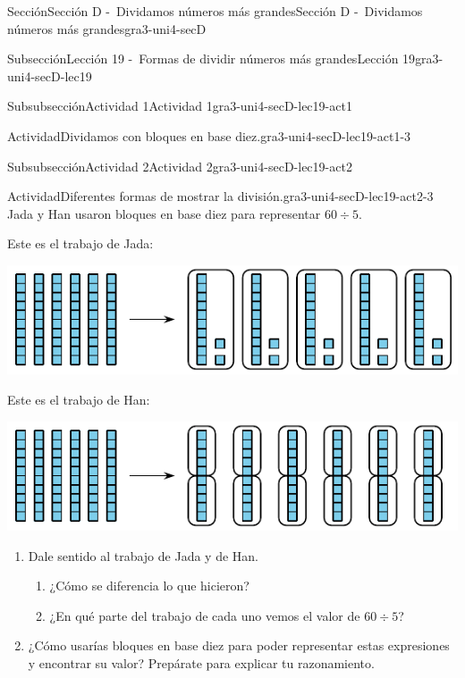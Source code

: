 \documentclass[twoside,10pt,]{article}
\begin{document}
\begin{sectionptx}{Sección}{Sección D -~Dividamos números más grandes}{}{Sección D -~Dividamos números más grandes}{}{}{gra3-uni4-secD}
\begin{subsectionptx}{Subsección}{Lección 19 -~Formas de dividir números más grandes}{}{Lección 19}{}{}{gra3-uni4-secD-lec19}
\begin{subsubsectionptx}{Subsubsección}{Actividad 1}{}{Actividad 1}{}{}{gra3-uni4-secD-lec19-act1}
\begin{activity}{Actividad}{Dividamos con bloques en base diez.}{gra3-uni4-secD-lec19-act1-3}
\begin{sidebyside}{2}{0}{0}{0.1}
\begin{sbspanel}{0.2}
\end{sbspanel}%
\end{sidebyside}%
\end{activity}%
\end{subsubsectionptx}
%
%
\typeout{************************************************}
\typeout{************************************************}
%
\begin{subsubsectionptx}{Subsubsección}{Actividad 2}{}{Actividad 2}{}{}{gra3-uni4-secD-lec19-act2}
\begin{activity}{Actividad}{Diferentes formas de mostrar la división.}{gra3-uni4-secD-lec19-act2-3}%
Jada y Han usaron bloques en base diez para representar \(60 \div 5\).%
\par
Este es el trabajo de Jada:%
\begin{image}{0}{1}{0}{}%
\includegraphics[width=\linewidth]{external/svg-source/tikz-file-152963.pdf}
\end{image}%
Este es el trabajo de Han:%
\begin{image}{0}{1}{0}{}%
\includegraphics[width=\linewidth]{external/svg-source/tikz-file-152964.pdf}
\end{image}%
%
\begin{enumerate}
\item{}Dale sentido al trabajo de Jada y de Han.%
%
\begin{enumerate}
\item{}¿Cómo se diferencia lo que hicieron?%
\item{}¿En qué parte del trabajo de cada uno vemos el valor de \(60 \div 5\)?%
\end{enumerate}
\item{}¿Cómo usarías bloques en base diez para poder representar estas expresiones y encontrar su valor? Prepárate para explicar tu razonamiento.%

\end{enumerate}
\end{activity}
\end{subsubsectionptx}
\end{subsectionptx}
\end{sectionptx}
\end{document}
